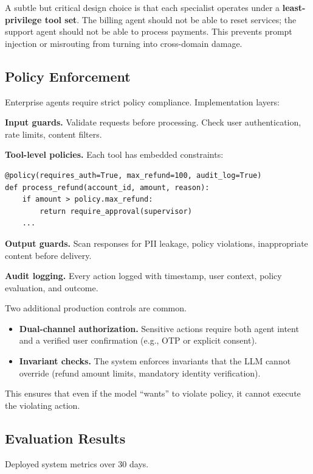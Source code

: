 A subtle but critical design choice is that each specialist operates under a \textbf{least-privilege tool set}. The billing agent should not be able to reset services; the support agent should not be able to process payments. This prevents prompt injection or misrouting from turning into cross-domain damage.

\subsection{Policy Enforcement}

Enterprise agents require strict policy compliance. Implementation layers:

\textbf{Input guards.} Validate requests before processing. Check user authentication, rate limits, content filters.

\textbf{Tool-level policies.} Each tool has embedded constraints:
\begin{verbatim}
@policy(requires_auth=True, max_refund=100, audit_log=True)
def process_refund(account_id, amount, reason):
    if amount > policy.max_refund:
        return require_approval(supervisor)
    ...
\end{verbatim}

\textbf{Output guards.} Scan responses for PII leakage, policy violations, inappropriate content before delivery.

\textbf{Audit logging.} Every action logged with timestamp, user context, policy evaluation, and outcome.

Two additional production controls are common.
\begin{itemize}
\item \textbf{Dual-channel authorization.} Sensitive actions require both agent intent and a verified user confirmation (e.g., OTP or explicit consent).
\item \textbf{Invariant checks.} The system enforces invariants that the LLM cannot override (refund amount limits, mandatory identity verification).
\end{itemize}
This ensures that even if the model ``wants'' to violate policy, it cannot execute the violating action.

\subsection{Evaluation Results}

Deployed system metrics over 30 days.

